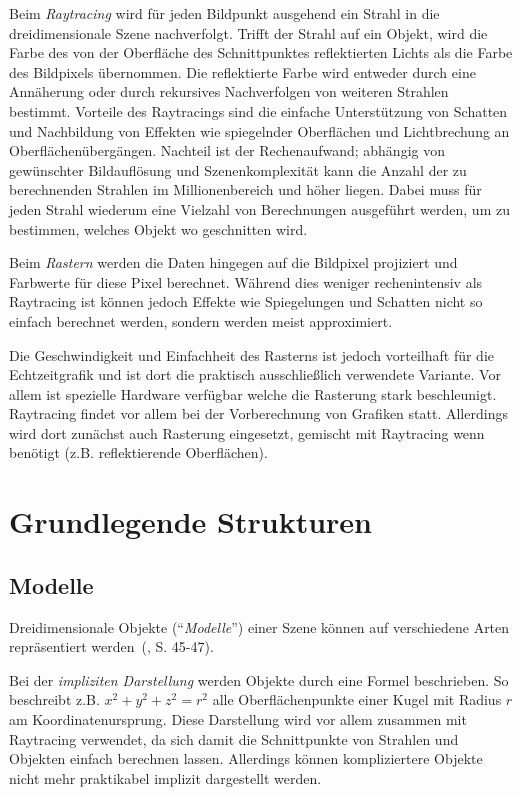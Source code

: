 \documentclass[twoside,a4paper,fleqn,12pt]{book}
\begin{document}
Beim \emph{Raytracing} wird für jeden Bildpunkt ausgehend ein Strahl in die dreidimensionale Szene nachverfolgt. Trifft
der Strahl auf ein Objekt, wird die Farbe des von der Oberfläche des Schnittpunktes reflektierten Lichts als die Farbe
des Bildpixels übernommen. Die reflektierte Farbe wird entweder durch eine Annäherung oder durch rekursives
Nachverfolgen von weiteren Strahlen bestimmt. Vorteile des Raytracings sind die einfache Unterstützung von Schatten und Nachbildung von Effekten wie spiegelnder
Oberflächen und Lichtbrechung an Oberflächenübergängen. Nachteil ist der Rechenaufwand; abhängig von gewünschter Bildauflösung und
Szenenkomplexität kann die Anzahl der zu berechnenden Strahlen im Millionenbereich und höher liegen.
Dabei muss für jeden Strahl wiederum eine Vielzahl von Berechnungen ausgeführt werden, um zu bestimmen, welches Objekt wo
geschnitten wird.

Beim \emph{Rastern} werden die Daten hingegen auf die Bildpixel projiziert und Farbwerte für diese Pixel berechnet.
Während dies weniger rechenintensiv als Raytracing ist können jedoch Effekte wie Spiegelungen und Schatten nicht so
einfach berechnet werden, sondern werden meist approximiert.

Die Geschwindigkeit und Einfachheit des Rasterns ist jedoch vorteilhaft für die Echtzeitgrafik und ist dort die praktisch
ausschließlich verwendete Variante. %
Vor allem ist spezielle Hardware verfügbar welche die Rasterung stark beschleunigt. %
Raytracing findet vor allem bei der Vorberechnung von Grafiken statt. Allerdings wird dort zunächst auch Rasterung eingesetzt,
gemischt mit Raytracing wenn benötigt (z.B. reflektierende Oberflächen). %

\section{Grundlegende Strukturen}

\subsection{Modelle}

Dreidimensionale Objekte ("`\emph{Modelle}"') einer Szene können auf verschiedene Arten repräsentiert werden~(\cite{watt_de}, S. 45-47). 

Bei der \emph{impliziten Darstellung} werden Objekte durch eine Formel beschrieben. So beschreibt z.B. $x^2 + y^2 + z^2 = r^2$
alle Oberflächenpunkte einer Kugel mit Radius $r$ am Koordinatenursprung. Diese Darstellung wird vor allem zusammen
mit Raytracing verwendet, da sich damit die Schnittpunkte von Strahlen und Objekten einfach berechnen lassen. Allerdings
können kompliziertere Objekte nicht mehr praktikabel implizit dargestellt werden.
\end{document}
